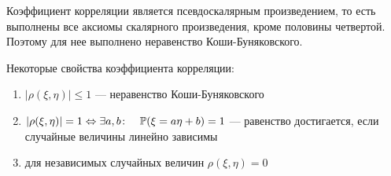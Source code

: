 Коэффициент корреляции является псевдоскалярным произведением, то есть выполнены все аксиомы скалярного произведения, кроме половины четвертой. Поэтому для нее выполнено неравенство Коши-Буняковского.

Некоторые свойства коэффициента корреляции:
\begin{enumerate}
	\item $|\rho(\xi, \eta)| \le 1$ --- неравенство Коши-Буняковского
	\item $|\rho(\xi, \eta)| = 1 \Leftrightarrow \exists a, b \colon \quad \mathbb{P}(\xi = a\eta + b) = 1$ --- равенство достигается, если случайные величины линейно зависимы
	\item для независимых случайных величин $\rho(\xi, \eta) = 0$
\end{enumerate} 



\newpage

